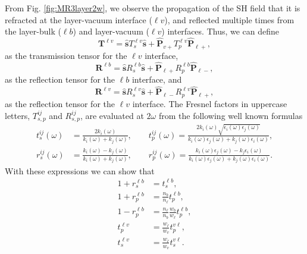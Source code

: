 From Fig. \ref{fig:MR3layer2w}, we observe the propagation of the SH field that
it is refracted at the layer-vacuum interface ($\ell v$), and  reflected
multiple times from the layer-bulk ($\ell b$) and layer-vacuum ($\ell v$)
interfaces. Thus, we can define
\begin{equation}\label{eq:r5}
\mathbf{T}^{\ell v}
= \hat{\mathbf{s}}T_{s}^{\ell v}\hat{\mathbf{s}} 
+ \hat{\mathbf{P}}_{v+}T_{p}^{\ell v} \hat{\mathbf{P}}_{\ell +},
\end{equation}
as the transmission tensor for the $\ell v$ interface,
\begin{equation}\label{eq:r6}
\mathbf{R}^{\ell b}
= \hat{\mathbf{s}}R_{s}^{\ell b}\hat{\mathbf{s}}
+ \hat{\mathbf{P}}_{\ell +}R_{p}^{\ell b} \hat{\mathbf{P}}_{\ell -},
\end{equation} 
as the reflection tensor for the $\ell b$ interface, and
\begin{equation}\label{eq:r6b}
\mathbf{R}^{\ell v}
= \hat{\mathbf{s}}R_{s}^{\ell v}\hat{\mathbf{s}}
+ \hat{\mathbf{P}}_{\ell -}R_{p}^{\ell v} \hat{\mathbf{P}}_{\ell +},
\end{equation} 
as the reflection tensor for the $\ell v$ interface. The Fresnel factors in
uppercase letters, $T^{ij}_{s,p}$ and $R^{ij}_{s,p}$, are evaluated at $2\omega$
from the following well known formulas
\begin{equation}\label{eq:e.f1}
\begin{split}
t_{s}^{ij}(\omega) &=
\frac{2k_{i}(\omega)}{k_{i}(\omega)+k_{j}(\omega)},
\quad\quad  
t_{p}^{ij}(\omega) =
\frac{2k_{i}(\omega)\sqrt{\epsilon_{i}(\omega)\epsilon_j(\omega)}}
     {k_{i}(\omega)\epsilon_{j}(\omega)+k_{j}(\omega)\epsilon_{i}(\omega)},\\
r_{s}^{ij}(\omega) &=
\frac{k_{i}(\omega) - k_{j}(\omega)}
     {k_{i}(\omega) + k_{j}(\omega)},
\quad\quad 
r_{p}^{ij}(\omega) =
\frac{k_{i}(\omega)\epsilon_{j}(\omega) - k_{j}\epsilon_{i}(\omega)}
     {k_{i}(\omega)\epsilon_{j}(\omega) + k_{j}(\omega)\epsilon_{i}(\omega)}. 
\end{split}
\end{equation}
With these expressions we can show that
\begin{equation}\label{eq:mf}
\begin{split}
1 + r^{\ell b}_{s} &= t^{\ell b}_{s},\\
1 + r^{\ell b}_{p} &= \frac{n_{b}}{n_{\ell}}t^{\ell b}_{p},\\
1 - r^{\ell b}_{p} &= \frac{n_{\ell}}{n_{b}}\frac{w_{b}}{w_{\ell}}t^{\ell b}_{p},\\
t^{\ell v}_{p} &= \frac{w_{\ell}}{w_{v}}t^{v\ell}_{p},\\
t^{\ell v}_{s} &= \frac{w_{\ell}}{w_{v}}t^{v\ell}_{s}.
\end{split}
\end{equation}


